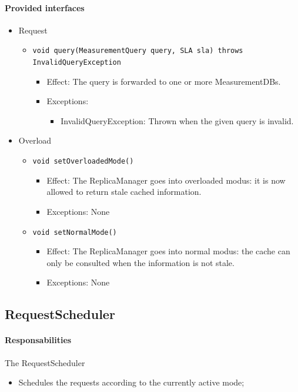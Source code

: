 \documentclass[a4paper,10pt]{article}
\begin{document}
\paragraph{Provided interfaces}
\begin{itemize}
    \item Request
    \begin{itemize}
        \item \texttt{void query(MeasurementQuery query, SLA sla) throws InvalidQueryException}
        \begin{itemize}
            \item Effect: The query is forwarded to one or more MeasurementDBs.
            \item Exceptions:
            \begin{itemize}
                \item InvalidQueryException: Thrown when the given query is invalid.
            \end{itemize}
		\end{itemize}
    \end{itemize}

    \item Overload
    \begin{itemize}
        \item \texttt{void setOverloadedMode()}
        \begin{itemize}
            \item Effect: The ReplicaManager goes into overloaded modus: it is now allowed to return stale cached information.
            \item Exceptions: None
        \end{itemize}
        \item \texttt{void setNormalMode()}
        \begin{itemize}
            \item Effect: The ReplicaManager goes into normal modus: the cache can only be consulted when the information is not stale.
            \item Exceptions: None
        \end{itemize}
    \end{itemize}
\end{itemize}


\subsection{RequestScheduler}
\paragraph{Responsabilities} 
The RequestScheduler
\begin{itemize}
	\item Schedules the requests according to the currently active mode;
\end{itemize}
\end{document}
